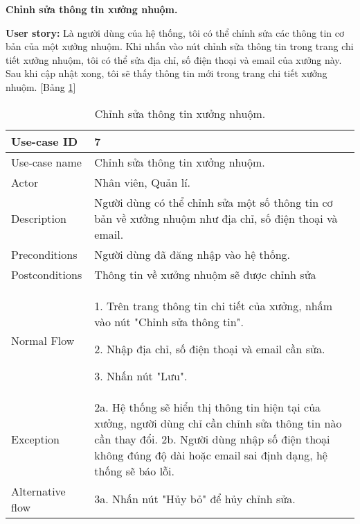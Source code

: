 \textbf{Chỉnh sửa thông tin xưởng nhuộm.}\par
\textbf{User story:} Là người dùng của hệ thống, tôi có thể chỉnh sửa các thông tin cơ bản của một xưởng nhuộm. Khi nhấn vào nút chỉnh sửa thông tin trong trang chi tiết xưởng nhuộm, tôi có thể sửa địa chỉ, số điện thoại và email của xưởng này. Sau khi cập nhật xong, tôi sẽ thấy thông tin mới trong trang chi tiết xưởng nhuộm. [Bảng \ref{bang4}]
\begin{table}[H]
    \centering
    \begin{tabular}{|m{3cm}|m{10cm}|}
    \hline 
        Use-case ID & 7\\ \hline
        Use-case name & Chỉnh sửa thông tin xưởng nhuộm.\\ \hline
        Actor & Nhân viên, Quản lí.\\ \hline
        Description & Người dùng có thể chỉnh sửa một số thông tin cơ bản về xưởng nhuộm như địa chỉ, số điện thoại và email.\\ \hline
        Preconditions & Người dùng đã đăng nhập vào hệ thống.\\ \hline
        Postconditions & Thông tin về xưởng nhuộm sẽ được chỉnh sửa\\ \hline
        Normal Flow & 
        1. Trên trang thông tin chi tiết của xưởng, nhấm vào nút "Chỉnh sửa thông tin".\par
        2. Nhập địa chỉ, số điện thoại và email cần sửa.\par
        3. Nhấn nút "Lưu".
        \\ \hline
        Exception & 
        2a. Hệ thống sẽ hiển thị thông tin hiện tại của xưởng, người dùng chỉ cần chỉnh sửa thông tin nào cần thay đổi.
        2b. Người dùng nhập số điện thoại không đúng độ dài hoặc email sai định dạng, hệ thống sẽ báo lỗi.
        \\ \hline
        Alternative flow & 
        3a. Nhấn nút "Hủy bỏ" để hủy chỉnh sửa.
        \\ 
    \hline 
    \end{tabular}
    \caption{Chỉnh sửa thông tin xưởng nhuộm.}
    \label{bang4}
\end{table}


